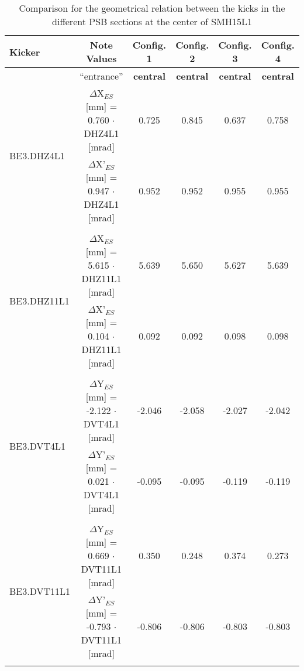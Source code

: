 \documentclass[11pt,letter,english]{article}
\begin{document}
\begin{table}[h]

  \caption{
    Comparison for the geometrical relation between the kicks in the different PSB sections at the center of SMH15L1
    }

  \label{tab:geom_rel}
\hspace*{-1.3cm}\begin{tabular}{ |l|c|c|c|c|c| }        \hline
  Kicker & Note Values  & Config. 1 &  Config. 2 & Config. 3 & Config. 4 \\ \hline
         & ``entrance'' & {\bf central}  & {\bf central}  & {\bf central}  & {\bf central}  \\ \hline
  \multirow{2}{*}{BE3.DHZ4L1} & $\Delta$X$_{ES}$[mm]  = 0.760 $\cdot$ DHZ4L1 [mrad] & 0.725 & 0.845 & 0.637 & 0.758\\  \cline{2-6}
                              & $\Delta$X'$_{ES}$[mm] = 0.947 $\cdot$ DHZ4L1 [mrad] & 0.952 & 0.952 & 0.955 & 0.955\\  \hline      
  \multicolumn{6}{|c|}{}        \\ \hline

  \multirow{2}{*}{BE3.DHZ11L1} & $\Delta$X$_{ES}$[mm]  = 5.615 $\cdot$ DHZ11L1 [mrad] & 5.639 & 5.650 & 5.627 & 5.639\\ \cline{2-6} 
                               & $\Delta$X'$_{ES}$[mm] = 0.104 $\cdot$ DHZ11L1 [mrad] & 0.092 & 0.092 & 0.098 & 0.098\\ \hline      
 \multicolumn{6}{|c|}{} \\ \hline

 \multirow{2}{*}{BE3.DVT4L1} & $\Delta$Y$_{ES}$[mm]  = -2.122 $\cdot$ DVT4L1 [mrad] & -2.046 & -2.058 & -2.027 & -2.042\\  \cline{2-6}  
                             & $\Delta$Y'$_{ES}$[mm] =  0.021 $\cdot$ DVT4L1 [mrad] & -0.095 & -0.095 & -0.119 & -0.119\\  \hline       
 \multicolumn{6}{|c|}{} \\ \hline

 \multirow{2}{*}{BE3.DVT11L1} & $\Delta$Y$_{ES}$[mm]  =  0.669 $\cdot$ DVT11L1 [mrad] & 0.350 & 0.248 & 0.374 & 0.273\\     \cline{2-6}  
                              & $\Delta$Y'$_{ES}$[mm] = -0.793 $\cdot$ DVT11L1 [mrad] & -0.806 & -0.806 & -0.803 & -0.803\\ \hline       
 \multicolumn{6}{|c|}{} \\ \hline

\end{tabular}
\end{table}
\end{document}
